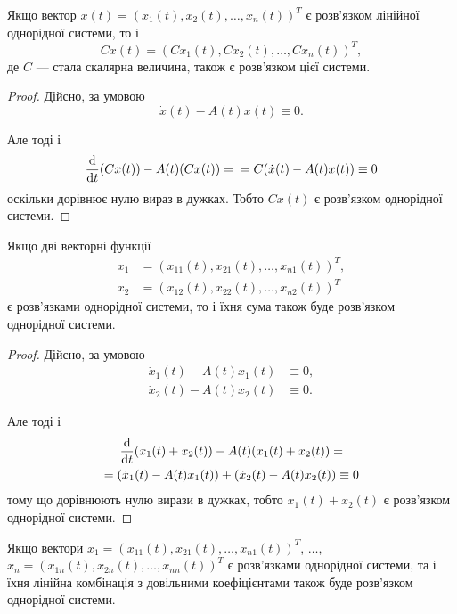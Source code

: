 \setcounter{property}{0}
\begin{property}
	Якщо вектор $x(t) = (x_1(t), x_2(t), \ldots, x_n(t))^T$ є розв'язком лінійної однорідної системи, то і \[ C x(t) = (C x_1(t), C x_2(t), \ldots, C x_n(t))^T,\] де $C$ --- стала скалярна величина, також є розв'язком цієї системи.
\end{property}

\begin{proof}
	Дійсно, за умовою 
	\begin{equation*}
		\dot x(t) - A(t) x(t) \equiv 0.
	\end{equation*}

	Але тоді і
	\begin{equation*}
		\frac{\mathop{}\!\mathrm{d}}{\mathop{}\!\mathrm{d} t} (C x(t)) - A(t) (C x(t)) = \\ = C (\dot x(t) - A(t) x(t)) \equiv 0
	\end{equation*}
	оскільки дорівнює нулю вираз в дужках. Тобто $C x(t)$ є розв'язком однорідної системи.
\end{proof}

\begin{property}
	Якщо дві векторні функції \begin{align*} x_1 &= (x_{11}(t), x_{21}(t), \ldots, x_{n1}(t))^T, \\ x_2 &= (x_{12}(t), x_{22}(t), \ldots, x_{n2}(t))^T \end{align*} є розв'язками однорідної системи, то і їхня сума також буде розв'язком однорідної системи.
\end{property}

\begin{proof}
	Дійсно, за умовою
	\begin{align*}
		\dot x_1(t) - A(t) x_1(t) &\equiv 0, \\
		\dot x_2(t) - A(t) x_2(t) &\equiv 0.
	\end{align*}

	Але тоді і
	\begin{multline*}
		\frac{\mathop{}\!\mathrm{d}}{\mathop{}\!\mathrm{d} t} (x_1(t) + x_2(t)) - A(t) (x_1(t) + x_2(t)) = \\ = (\dot x_1(t) - A(t) x_1(t)) + (\dot x_2(t) - A(t) x_2(t)) \equiv 0
	\end{multline*}
	тому що дорівнюють нулю вирази в дужках, тобто $x_1(t) + x_2(t)$ є розв'язком однорідної системи.
\end{proof}

\begin{property}
	Якщо вектори $x_1 = (x_{11}(t), x_{21}(t), \ldots, x_{n1}(t))^T$, $\ldots$, $x_n = (x_{1n}(t), x_{2n}(t), \ldots, x_{nn}(t))^T$ є розв'язками однорідної системи, та і їхня лінійна комбінація з довільними коефіцієнтами також буде розв'язком однорідної системи. 
\end{property}

